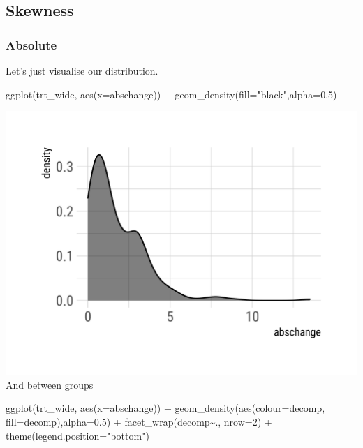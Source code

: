 \documentclass[
]{article}
\newenvironment{Shaded}{\begin{snugshade}}{\end{snugshade}}
\newcommand{\AttributeTok}[1]{\textcolor[rgb]{0.77,0.63,0.00}{#1}}
\newcommand{\DecValTok}[1]{\textcolor[rgb]{0.00,0.00,0.81}{#1}}
\newcommand{\FloatTok}[1]{\textcolor[rgb]{0.00,0.00,0.81}{#1}}
\newcommand{\FunctionTok}[1]{\textcolor[rgb]{0.00,0.00,0.00}{#1}}
\newcommand{\NormalTok}[1]{#1}
\newcommand{\SpecialCharTok}[1]{\textcolor[rgb]{0.00,0.00,0.00}{#1}}
\newcommand{\StringTok}[1]{\textcolor[rgb]{0.31,0.60,0.02}{#1}}
\begin{document}
\hypertarget{skewness}{%
\subsection{Skewness}\label{skewness}}

\hypertarget{absolute-1}{%
\subsubsection{Absolute}\label{absolute-1}}

Let's just visualise our distribution.

\begin{Shaded}
\begin{Highlighting}[]
\FunctionTok{ggplot}\NormalTok{(trt\_wide, }\FunctionTok{aes}\NormalTok{(}\AttributeTok{x=}\NormalTok{abschange)) }\SpecialCharTok{+}
  \FunctionTok{geom\_density}\NormalTok{(}\AttributeTok{fill=}\StringTok{"black"}\NormalTok{,}\AttributeTok{alpha=}\FloatTok{0.5}\NormalTok{)}
\end{Highlighting}
\end{Shaded}

\includegraphics{figures/unnamed-chunk-25-1.png} And between groups

\begin{Shaded}
\begin{Highlighting}[]
\FunctionTok{ggplot}\NormalTok{(trt\_wide, }\FunctionTok{aes}\NormalTok{(}\AttributeTok{x=}\NormalTok{abschange)) }\SpecialCharTok{+}
  \FunctionTok{geom\_density}\NormalTok{(}\FunctionTok{aes}\NormalTok{(}\AttributeTok{colour=}\NormalTok{decomp, }\AttributeTok{fill=}\NormalTok{decomp),}\AttributeTok{alpha=}\FloatTok{0.5}\NormalTok{) }\SpecialCharTok{+}
  \FunctionTok{facet\_wrap}\NormalTok{(decomp}\SpecialCharTok{\textasciitilde{}}\NormalTok{., }\AttributeTok{nrow=}\DecValTok{2}\NormalTok{) }\SpecialCharTok{+}
  \FunctionTok{theme}\NormalTok{(}\AttributeTok{legend.position=}\StringTok{"bottom"}\NormalTok{)}
\end{Highlighting}
\end{Shaded}
\end{document}
